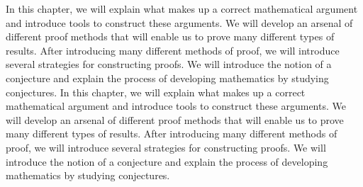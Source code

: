 \documentclass{Axon}
\begin{document}
In this chapter, we will explain what makes up a correct mathematical argument and introduce tools to construct these arguments. We will develop an arsenal of different proof methods that will enable us to prove many different types of results. After introducing many different methods of proof, we will introduce several strategies for constructing proofs. We will introduce the notion of a conjecture and explain the process of developing mathematics by studying conjectures.
In this chapter, we will explain what makes up a correct mathematical argument and introduce tools to construct these arguments. We will develop an arsenal of different proof methods that will enable us to prove many different types of results. After introducing many different methods of proof, we will introduce several strategies for constructing proofs. We will introduce the notion of a conjecture and explain the process of developing mathematics by studying conjectures.

\printbibliography
\end{document}
